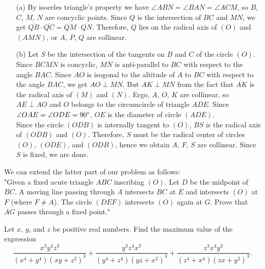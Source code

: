 \documentclass[11pt]{article}
\begin{document}
        \begin{solution}
            \hfill
            \begin{enumerate}
                \item[(a)] By isoceles triangle's property we have \(\angle ABN = \angle BAN = \angle ACM\), so \(B\), \(C\), \(M\), \(N\) are concyclic points. Since \(Q\) is the intersection of \(BC\) and \(MN\), we get \(\overline{QB} \cdot \overline{QC} = \overline{QM} \cdot \overline{QN}\). Therefore, \(Q\) lies on the radical axis of \((O)\) and \((AMN)\), or \(A\), \(P\), \(Q\) are collinear.
                
                \item[(b)] Let \(S\) be the intersection of the tangents on \(B\) and \(C\) of the circle \((O)\).\\
                Since \(BCMN\) is concyclic, \(MN\) is anti-parallel to \(BC\) with respect to the angle \(BAC\). Since \(AO\) is isogonal to the altitude of \(A\) to \(BC\) with respect to the angle \(BAC\), we get \(AO \perp MN\). But \(AK \perp MN\) from the fact that \(AK\) is the radical axis of \((M)\) and \((N)\). Ergo, \(A\), \(O\), \(K\) are collinear, so \(AE \perp AO\) and \(O\) belongs to the circumcircle of triangle \(ADE\). Since \(\angle OAE = \angle ODE = 90 \degree\), \(OE\) is the diameter of circle \((ADE)\).\\
                Since the circle \((ODB)\) is internally tangent to \((O)\), \(BS\) is the radical axis of \((ODB)\) and \((O)\). Therefore, \(S\) must be the radical center of circles \((O)\), \((ODE)\), and \((ODB)\), hence we obtain \(A\), \(F\), \(S\) are collinear. Since \(S\) is fixed, we are done.
            \end{enumerate}
        \end{solution}

        \begin{remark}
            We can extend the latter part of our problem as follows:\\
            "Given a fixed acute triangle \(ABC\) inscribing \((O)\). Let \(D\) be the midpoint of \(BC\). A moving line passing through \(A\) intersects \(BC\) at \(E\) and intersects \((O)\) at \(F\) (where \(F \neq A\)). The circle \((DEF)\) intersects \((O)\) again at \(G\). Prove that \(AG\) passes through a fixed point."
        \end{remark}

        \newpage

        \begin{problem}
            Let \(x\), \(y\), and \(z\) be positive real numbers. Find the maximum value of the expression
            \[\frac{x^3y^4z^3}{(x^4 + y^4)(xy + z^2)^3} + \frac{y^3z^4x^3}{(y^4 + z^4)(yz + x^2)^3} + \frac{z^3x^4y^3}{(z^4 + x^4)(zx + y^2)^3}.\]
        \end{problem}
\end{document}
